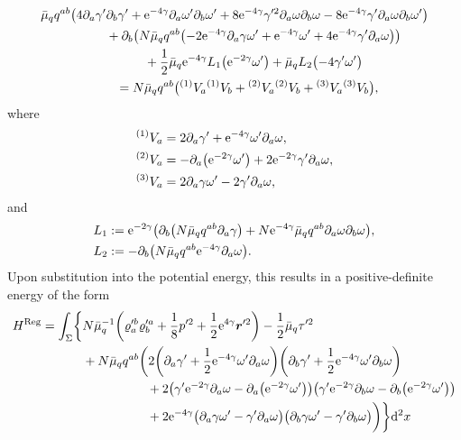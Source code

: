 \documentclass[pdftex]{sigma}
\def\ptl{\partial}%
\def\mbo#1{\boldsymbol{#1}}%
\newcommand{\leftexp}[2]{{\vphantom{#2}}^{#1}{#2}}
\def\halb{\frac{1}{2}}%
\numberwithin{equation}{section}
\begin{document}
\begin{gather*}
\bar{\mu}_q q^{ab} \bigl(4 \ptl_a \gamma'
\ptl_b \gamma' + {\rm e}^{-4\gamma} \ptl_a \omega' \ptl_b \omega' + 8{\rm e}^{-4\gamma} \gamma'^2 \ptl_a \omega \ptl_b \omega-8{\rm e}^{-4\gamma} \gamma' \ptl_a \omega \ptl_b \omega'\bigr) \\
\qquad\quad{}+ \ptl_b \bigl(N \bar{\mu}_q q^{ab} \bigl(-2 {\rm e}^{-4\gamma} \ptl_a \gamma \omega' + {\rm e}^{-4\gamma} \omega' + 4 {\rm e}^{-4\gamma} \gamma' \ptl_a \omega\bigr)\bigr) \\
\qquad\quad{}+ \halb \bar{\mu}_q {\rm e}^{-4\gamma} L_1 \bigl({\rm e}^{-2\gamma} \omega'\bigr) + \bar{\mu}_q L_2 \bigl(-4\gamma' \omega'\bigr) \\
\qquad{}= N \bar{\mu}_q q^{ab} \bigl(\leftexp{(1)}{V}_a \leftexp{(1)}{V}_b + \leftexp{(2)}{V}_a \leftexp{(2)}{V}_b + \leftexp{(3)}{V}_a \leftexp{(3)}{V}_b\bigr),
\end{gather*}
where
\begin{align*}
&\leftexp{(1)}{V}_a = 2 \ptl_a \gamma' + {\rm e}^{-4\gamma} \omega' \ptl_a \omega, \\
&\leftexp{(2)}{V}_a= -\ptl_a \bigl({\rm e}^{-2\gamma}\omega'\bigr) + 2 {\rm e}^{-2\gamma}\gamma' \ptl_a \omega, \\
&\leftexp{(3)}{V}_a = 2 \ptl_a \gamma \omega' -2\gamma' \ptl_a \omega,
\end{align*}
and
\begin{align*}
&L_1 := {\rm e}^{-2 \gamma} \bigl(\ptl_b \bigl(N \bar{\mu}_q q^{ab} \ptl_a \gamma\bigr) + N {\rm e}^{-4\gamma} \bar{\mu}_q q^{ab} \ptl_a \omega \ptl_b \omega\bigr), \\
&L_2 := - \ptl_b\bigl(N \bar{\mu}_q q^{ab} {\rm e}^{-4\gamma} \ptl_a \omega\bigr).
\end{align*}
Upon substitution into the potential energy, this results in a positive-definite energy of the form
\begin{align*}
H^{{\rm Reg}} = \int_{\Sigma} \biggl\{& N \bar{\mu}^{-1}_q \biggl(
\varrho'^{b}_a \varrho'^{a}_b + \frac{1}{8} p'^2+ \halb
{\rm e}^{4\gamma} \mbo{r}'^2 \biggr) - \halb \bar{\mu}_q \tau'^2 \notag\\
&{}+ N \bar{\mu}_q q^{ab} \biggl(2 \biggl(\ptl_a \gamma' + \halb {\rm e}^{-4\gamma} \omega' \ptl_a \omega\biggr) \biggl(\ptl_b \gamma' + \halb {\rm e}^{-4\gamma} \omega' \ptl_b \omega\biggr) \notag\\
&\hphantom{+ N \bar{\mu}_q q^{ab} \biggl(\ }{}+ 2\bigl(\gamma' {\rm e}^{-2\gamma}\ptl_a \omega - \ptl_a \bigl({\rm e}^{-2\gamma} \omega'\bigr)\bigr)\bigl(\gamma' {\rm e}^{-2\gamma}\ptl_b \omega - \ptl_b \bigl({\rm e}^{-2\gamma} \omega'\bigr)\bigr) \notag\\
 &\hphantom{+ N \bar{\mu}_q q^{ab} \biggl(\ }{}+ 2{\rm e}^{-4\gamma} \bigl(\ptl_a \gamma \omega' - \gamma' \ptl_a \omega\bigr)\bigl(\ptl_b \gamma \omega' - \gamma' \ptl_b \omega\bigr) \biggr)
\biggr\}{\rm d}^2 x
\end{align*}
\end{document}
